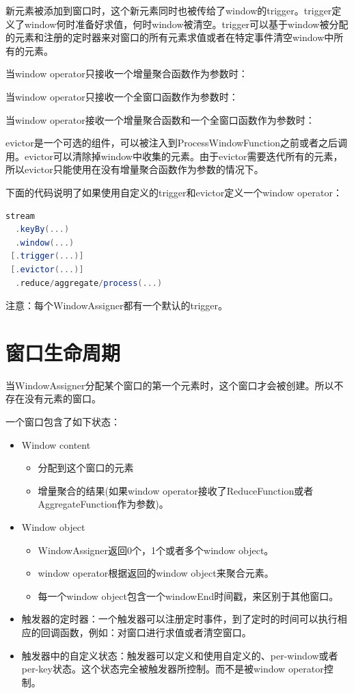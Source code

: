 \documentclass[oneside]{ctexbook}
\begin{document}
新元素被添加到窗口时，这个新元素同时也被传给了window的trigger。trigger定义了window何时准备好求值，何时window被清空。trigger可以基于window被分配的元素和注册的定时器来对窗口的所有元素求值或者在特定事件清空window中所有的元素。

当window operator只接收一个增量聚合函数作为参数时：

当window operator只接收一个全窗口函数作为参数时：

当window operator接收一个增量聚合函数和一个全窗口函数作为参数时：

evictor是一个可选的组件，可以被注入到ProcessWindowFunction之前或者之后调用。evictor可以清除掉window中收集的元素。由于evictor需要迭代所有的元素，所以evictor只能使用在没有增量聚合函数作为参数的情况下。

下面的代码说明了如果使用自定义的trigger和evictor定义一个window operator：

\begin{lstlisting}[language=scala]
stream
  .keyBy(...)
  .window(...)
 [.trigger(...)]
 [.evictor(...)]
  .reduce/aggregate/process(...)
\end{lstlisting}

注意：每个WindowAssigner都有一个默认的trigger。

\section{窗口生命周期}

当WindowAssigner分配某个窗口的第一个元素时，这个窗口才会被创建。所以不存在没有元素的窗口。

一个窗口包含了如下状态：

\begin{itemize}
  \item Window content
  \begin{itemize}
    \item 分配到这个窗口的元素
    \item 增量聚合的结果(如果window operator接收了ReduceFunction或者AggregateFunction作为参数)。
  \end{itemize}
  \item Window object
  \begin{itemize}
    \item WindowAssigner返回0个，1个或者多个window object。
    \item window operator根据返回的window object来聚合元素。
    \item 每一个window object包含一个windowEnd时间戳，来区别于其他窗口。
  \end{itemize}
  \item 触发器的定时器：一个触发器可以注册定时事件，到了定时的时间可以执行相应的回调函数，例如：对窗口进行求值或者清空窗口。
  \item 触发器中的自定义状态：触发器可以定义和使用自定义的、per-window或者per-key状态。这个状态完全被触发器所控制。而不是被window operator控制。
\end{itemize}
\end{document}
